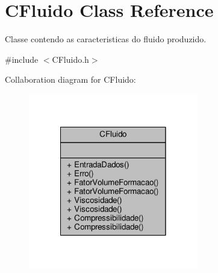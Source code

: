 \hypertarget{classCFluido}{\section{C\-Fluido Class Reference}
\label{classCFluido}
}


Classe contendo as caracteristicas do fluido produzido.  




{\ttfamily \#include $<$C\-Fluido.\-h$>$}



Collaboration diagram for C\-Fluido\-:
\nopagebreak
\begin{figure}[H]
\begin{center}
\leavevmode
\includegraphics[width=210pt]{classCFluido__coll__graph}
\end{center}
\end{figure}
